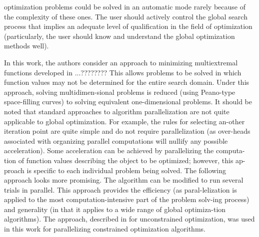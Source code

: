 \documentclass[runningheads]{llncs}
\begin{document}
optimization problems could be solved in an automatic mode rarely because of the
complexity of these ones. The user should actively control the global search
process that implies an adequate level of qualification in the field of optimization
(particularly, the user should know and understand the global optimization methods well).
\par
In this work, the authors consider an approach to minimizing multiextremal functions developed in ...????????
This allows problems to be solved in which function values may not be determined for the entire search domain. Under this approach, solving multidimen-sional problems is reduced (using Peano-type space-filling curves) to solving equivalent one-dimensional problems.
It should be noted that standard approaches to algorithm parallelization are not quite applicable to global optimization. For example, the rules for selecting an-other iteration point are quite simple and do not require parallelization (as over-heads associated with organizing parallel computations will nullify any possible acceleration). Some acceleration can be achieved by parallelizing the computa-tion of function values describing the object to be optimized; however, this ap-proach is specific to each individual problem being solved.
The following approach looks more promising. The algorithm can be modified to run several trials in parallel. This approach provides the efficiency (as paral-lelization is applied to the most computation-intensive part of the problem solv-ing process) and generality (in that it applies to a wide range of global optimiza-tion algorithms). The approach, described in  \cite{Two_Level_Parallel} for unconstrained optimization, was used in this work for parallelizing constrained optimization algorithms.

\end{document}
